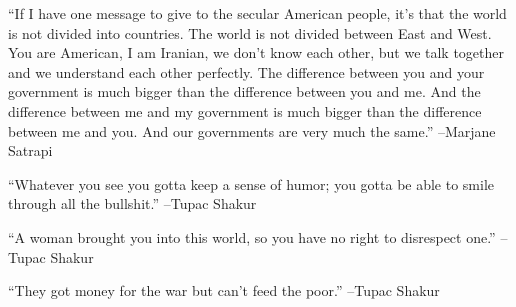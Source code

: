 \documentclass{article}%
\begin{document}
\begin{minipage}{\textwidth}%
\flushleft%
“If I have one message to give to the secular American people, it's that the world is not divided into countries. The world is not divided between East and West. You are American, I am Iranian, we don't know each other, but we talk together and we understand each other perfectly. The difference between you and your government is much bigger than the difference between you and me. And the difference between me and my government is much bigger than the difference between me and you. And our governments are very much the same.”%
\linebreak%
\vspace{1mm}%
–Marjane Satrapi%
\linebreak%
\vspace{1mm}%
\end{minipage}%
\linebreak%
\vspace{1mm}%
\begin{minipage}{\textwidth}%
\flushleft%
“Whatever you see you gotta keep a sense of humor; you gotta be able to smile through all the bullshit.”%
\linebreak%
\vspace{1mm}%
–Tupac Shakur%
\linebreak%
\vspace{1mm}%
\end{minipage}%
\linebreak%
\vspace{1mm}%
\begin{minipage}{\textwidth}%
\flushleft%
“A woman brought you into this world, so you have no right to disrespect one.”%
\linebreak%
\vspace{1mm}%
–Tupac Shakur%
\linebreak%
\vspace{1mm}%
\end{minipage}%
\linebreak%
\vspace{1mm}%
\begin{minipage}{\textwidth}%
\flushleft%
“They got money for the war but can't feed the poor.”%
\linebreak%
\vspace{1mm}%
–Tupac Shakur%
\linebreak%
\vspace{1mm}%
\end{minipage}%
\linebreak%
\end{document}

